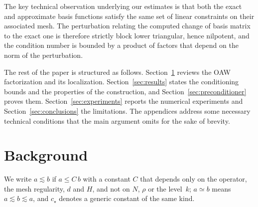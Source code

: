 \documentclass[hidelinks]{siamart}
\theoremstyle{nonumberplain}
\numberwithin{theorem}{section}
\begin{document}
The key technical observation underlying our estimates is that both the
exact and approximate basis functions satisfy the same set of linear
constraints on their associated mesh.  The perturbation relating the
computed change of basis matrix to the exact one is therefore strictly
block lower triangular, hence nilpotent, and the condition number is
bounded by a product of factors that depend on the norm of
the perturbation.

The rest of the paper is structured as follows.
Section~\ref{sec:background} reviews the OAW factorization and its
localization.  Section~\ref{sec:results} states the conditioning bounds
and the properties of the construction, and
Section~\ref{sec:preconditioner} proves them.
Section~\ref{sec:experiments} reports the numerical experiments and
Section~\ref{sec:conclusions} the limitations.  The appendices address some necessary technical conditions that the main argument omits for the sake of brevity.
\section{Background}
\label{sec:background}
We write $a \lesssim b$ if $a \leq C\,b$ with a constant $C$ that depends
only on the operator, the mesh regularity, $d$ and $H$, and not on $N$,
$\rho$ or the level~$k$; $a \simeq b$ means $a \lesssim b \lesssim a$,
and $c_\star$ denotes a generic constant of the same kind.
\end{document}
